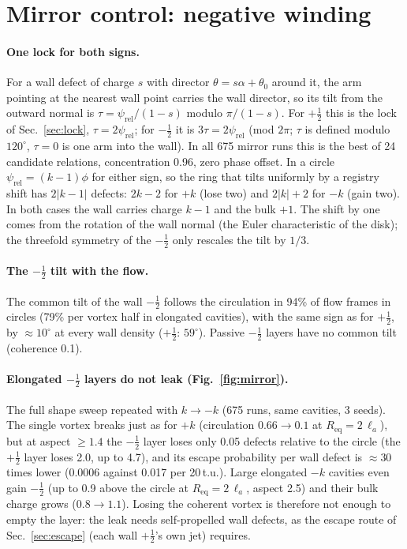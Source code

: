 \documentclass[11pt,a4paper]{article}
\newcommand{\half}{\tfrac12}
\newcommand{\la}{\ell_a}
\begin{document}
\section{Mirror control: negative winding}\label{sec:mirror}
\paragraph{One lock for both signs.} For a wall defect of charge $s$ with director $\theta=s\alpha+\theta_0$ around it, the arm pointing at the nearest wall point carries the wall director,
so its tilt from the outward normal is $\tau=\psi_\mathrm{rel}/(1-s)$ modulo $\pi/(1-s)$. For $+\half$ this is the lock of Sec.~\ref{sec:lock}, $\tau=2\psi_\mathrm{rel}$; for $-\half$ it is
$3\tau=2\psi_\mathrm{rel}$ (mod $2\pi$; $\tau$ is defined modulo $120^\circ$, $\tau=0$ is one arm into the wall). In all 675 mirror runs this is the best of 24 candidate relations,
concentration 0.96, zero phase offset. In a circle $\psi_\mathrm{rel}=(k-1)\phi$ for either sign, so the ring that tilts uniformly by a registry shift has $2|k-1|$ defects: $2k-2$ for $+k$ (lose
two) and $2|k|+2$ for $-k$ (gain two). In both cases the wall carries charge $k-1$ and the bulk $+1$. The shift by one comes from the rotation of the wall normal (the Euler characteristic of the
disk); the threefold symmetry of the $-\half$ only rescales the tilt by $1/3$.

\paragraph{The $-\half$ tilt with the flow.} The common tilt of the wall $-\half$ follows the circulation in 94\% of flow frames in circles (79\% per vortex half in elongated cavities), with
the same sign as for $+\half$, by $\approx10^\circ$ at every wall density ($+\half$: $59^\circ$). Passive $-\half$ layers have no common tilt (coherence 0.1).

\paragraph{Elongated $-\half$ layers do not leak (Fig.~\ref{fig:mirror}).} The full shape sweep repeated with $k\to-k$ (675 runs, same cavities, 3 seeds). The single vortex breaks just as
for $+k$ (circulation $0.66\to0.1$ at $R_\mathrm{eq}=2\,\la$), but at aspect $\ge1.4$ the $-\half$ layer loses only 0.05 defects relative to the circle (the $+\half$ layer loses 2.0, up to 4.7),
and its escape probability per wall defect is $\approx30$ times lower (0.0006 against 0.017 per 20\,t.u.). Large elongated $-k$ cavities even gain $-\half$ (up to 0.9 above the circle at
$R_\mathrm{eq}=2\,\la$, aspect 2.5) and their bulk charge grows ($0.8\to1.1$). Losing the coherent vortex is therefore not enough to empty the layer: the leak needs self-propelled wall defects,
as the escape route of Sec.~\ref{sec:escape} (each wall $+\half$'s own jet) requires.
\end{document}
